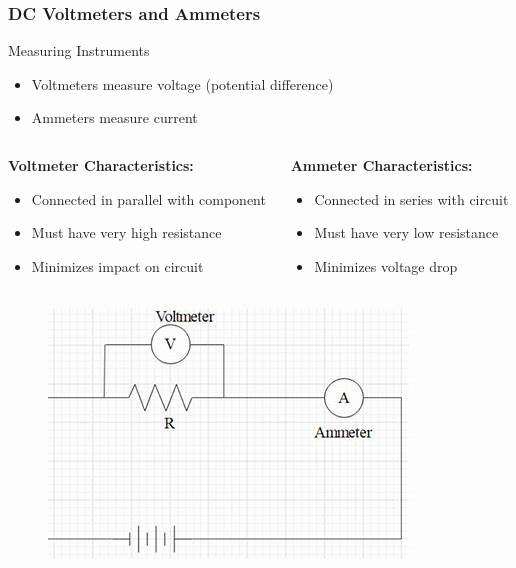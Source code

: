 \documentclass{beamer}
\begin{document}
\begin{frame}
    \frametitle{DC Voltmeters and Ammeters}
    \begin{block}{Measuring Instruments}
        \begin{itemize}
            \item Voltmeters measure voltage (potential difference)
            \item Ammeters measure current
        \end{itemize}
    \end{block}
    \begin{columns}
        \begin{column}{0.5\textwidth}
            \textbf{Voltmeter Characteristics:}
            \begin{itemize}
                \item Connected in parallel with component
                \item Must have very high resistance
                \item Minimizes impact on circuit
            \end{itemize}
        \end{column}
        \begin{column}{0.5\textwidth}
            \textbf{Ammeter Characteristics:}
            \begin{itemize}
                \item Connected in series with circuit
                \item Must have very low resistance
                \item Minimizes voltage drop
            \end{itemize}
        \end{column}
    \end{columns}
    \begin{figure}
        \centering
        \includegraphics[width=0.3\linewidth]{phys12-circuits-ammeter-voltmeter-connection.jpg}
    \end{figure}
\end{frame}
\end{document}
